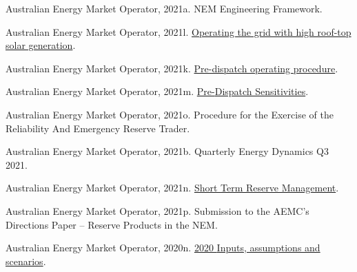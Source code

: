 \documentclass[12pt,a4paper,]{report}
\newlength{\cslhangindent}
\newenvironment{CSLReferences}[2] %
 {%
  \setlength{\parindent}{0pt}
  \ifodd #1 \everypar{\setlength{\hangindent}{\cslhangindent}}\ignorespaces\fi
  \ifnum #2 > 0
  \setlength{\parskip}{#2\baselineskip}
  \fi
 }%
 {}
\begin{document}
\begin{CSLReferences}{1}{0}
\leavevmode{}%
Australian Energy Market Operator, 2021a. {NEM Engineering Framework}.

\leavevmode{}%
Australian Energy Market Operator, 2021l.
\href{https://www.aemo.com.au/-/media/files/electricity/nem/security_and_reliability/power_system_ops/consumer-fact-sheet.pdf}{Operating
the grid with high roof-top solar generation}.

\leavevmode{}%
Australian Energy Market Operator, 2021k.
\href{https://www.aemo.com.au/-/media/files/electricity/nem/security_and_reliability/power_system_ops/procedures/so_op_3704-predispatch.pdf?la=en}{Pre-dispatch
operating procedure}.

\leavevmode{}%
Australian Energy Market Operator, 2021m.
\href{https://www.aemo.com.au/-/media/files/electricity/nem/security_and_reliability/dispatch/policy_and_process/pre-dispatch-sensitivities.pdf}{Pre-{Dispatch
Sensitivities}}.

\leavevmode{}%
Australian Energy Market Operator, 2021o. Procedure for the {Exercise}
of the {Reliability And Emergency Reserve Trader}.

\leavevmode{}%
Australian Energy Market Operator, 2021b. Quarterly {Energy Dynamics Q3}
2021.

\leavevmode{}%
Australian Energy Market Operator, 2021n.
\href{https://aemo.com.au/-/media/files/electricity/nem/security_and_reliability/power_system_ops/procedures/so_op_3703-short-term-reserve-management.pdf?la=en}{Short
{Term Reserve Management}}.

\leavevmode{}%
Australian Energy Market Operator, 2021p. Submission to the {AEMC}'s
{Directions Paper} -- {Reserve Products} in the {NEM}.

\leavevmode{}%
Australian Energy Market Operator, 2020n.
\href{https://aemo.com.au/-/media/files/electricity/nem/planning_and_forecasting/inputs-assumptions-methodologies/2020/2020-inputs-and-assumptions-workbook-dec20.xlsx?la=en}{2020
{Inputs}, assumptions and scenarios}.


\end{CSLReferences}
\end{document}
